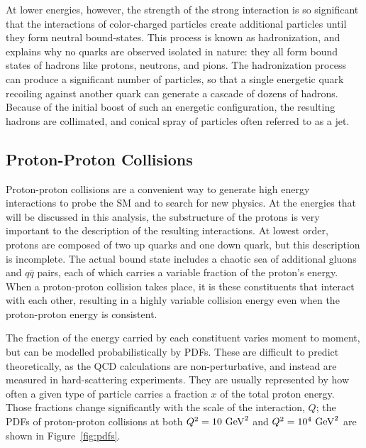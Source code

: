 At lower energies, however, the strength of the strong interaction is so significant that the interactions of color-charged particles create additional particles until they form neutral bound-states.
This process is known as hadronization, and explains why no quarks are observed isolated in nature: they all form bound states of hadrons like protons, neutrons, and pions.
The hadronization process can produce a significant number of particles, so that a single energetic quark recoiling against another quark can generate a cascade of dozens of hadrons.
Because of the initial boost of such an energetic configuration, the resulting hadrons are collimated, and conical spray of particles often referred to as a jet.

\subsection{Proton-Proton Collisions}
\label{sec:ppcollisions}

Proton-proton collisions are a convenient way to generate high energy interactions to probe the \ac{SM} and to search for new physics.
At the energies that will be discussed in this analysis, the substructure of the protons is very important to the description of the resulting interactions.
At lowest order, protons are composed of two up quarks and one down quark, but this description is incomplete.
The actual bound state includes a chaotic sea of additional gluons and $q\bar q$ pairs, each of which carries a variable fraction of the proton's energy.
When a proton-proton collision takes place, it is these constituents that interact with each other, resulting in a highly variable collision energy even when the proton-proton energy is consistent.

The fraction of the energy carried by each constituent varies moment to moment, but can be modelled probabilistically by \acp{PDF}.
These are difficult to predict theoretically, as the \ac{QCD} calculations are non-perturbative, and instead are measured in hard-scattering experiments.
They are usually represented by how often a given type of particle carries a fraction $x$ of the total proton energy.
Those fractions change significantly with the scale of the interaction, $Q$; the \acp{PDF} of proton-proton collisions at both $Q^2 = 10\ \mathrm{Ge\kern -0.05em V}^{2}$ and $Q^2 = 10^4\ \mathrm{Ge\kern -0.05em V}^{2}$ are shown in Figure~\ref{fig:pdfs}.

